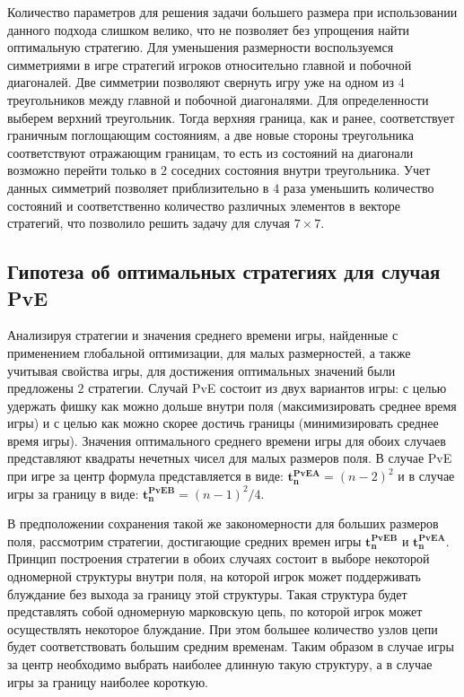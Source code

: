 Количество параметров для решения задачи большего размера при использовании данного подхода слишком велико, что не позволяет без упрощения найти оптимальную стратегию.
Для уменьшения размерности воспользуемся симметриями в игре стратегий игроков относительно главной и побочной диагоналей. 
Две симметрии позволяют свернуть игру уже на одном из $4$ треугольников между главной и побочной диагоналями. 
Для определенности выберем верхний треугольник. Тогда верхняя граница, как и ранее, соответствует граничным поглощающим состояниям,
а две новые стороны треугольника соответствуют отражающим границам, то есть из состояний на диагонали возможно перейти только в $2$ соседних состояния внутри треугольника.
Учет данных симметрий позволяет приблизительно в $4$ раза уменьшить количество состояний и соответственно количество различных элементов в векторе стратегий,
что позволило решить задачу для случая $7 \times 7$. 

\subsection{Гипотеза об оптимальных стратегиях для случая PvE}\label{subsec:ch3/sec1/sub3}

Анализируя стратегии и значения среднего времени игры, найденные с применением глобальной оптимизации, для малых размерностей,
а также учитывая свойства игры, для достижения оптимальных значений были предложены $2$ стратегии.
Случай PvE состоит из двух вариантов игры: с целью удержать фишку как можно дольше внутри поля (максимизировать среднее время игры)
и с целью как можно скорее достичь границы (минимизировать среднее время игры). 
Значения оптимального среднего времени игры для обоих случаев представляют квадраты нечетных чисел для малых размеров поля.
В случае PvE при игре за центр формула представляется в виде: $\boldsymbol{t_n^{PvE A}} = (n-2)^2$ и в случае
игры за границу в виде: $\boldsymbol{t_n^{PvE B}} = (n-1)^2/4$. 

В предположении сохранения такой же закономерности для больших размеров поля, рассмотрим стратегии, достигающие
средних времен игры $\boldsymbol{t_n^{PvE B}}$ и $\boldsymbol{t_n^{PvE A}}$. Принцип построения стратегии в обоих случаях 
состоит в выборе некоторой одномерной структуры внутри поля, на которой игрок может поддерживать блуждание без выхода за границу этой структуры.
Такая структура будет представлять собой одномерную марковскую цепь, по которой игрок может осуществлять некоторое блуждание.
При этом большее количество узлов цепи будет соответствовать большим средним временам. Таким образом в случае игры за центр
необходимо выбрать наиболее длинную такую структуру, а в случае игры за границу наиболее короткую.

